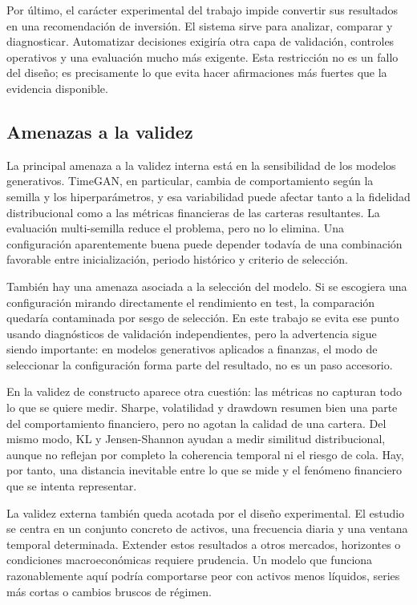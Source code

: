 \documentclass[11pt,a4paper,spanish,oneside]{book}
\numberwithin{equation}{chapter}
\numberwithin{figure}{chapter}
\begin{document}
Por último, el carácter experimental del trabajo impide convertir sus resultados en una recomendación de inversión. El sistema sirve para analizar, comparar y diagnosticar. Automatizar decisiones exigiría otra capa de validación, controles operativos y una evaluación mucho más exigente. Esta restricción no es un fallo del diseño; es precisamente lo que evita hacer afirmaciones más fuertes que la evidencia disponible.

\subsection{Amenazas a la validez}

La principal amenaza a la validez interna está en la sensibilidad de los modelos generativos. TimeGAN, en particular, cambia de comportamiento según la semilla y los hiperparámetros, y esa variabilidad puede afectar tanto a la fidelidad distribucional como a las métricas financieras de las carteras resultantes. La evaluación multi-semilla reduce el problema, pero no lo elimina. Una configuración aparentemente buena puede depender todavía de una combinación favorable entre inicialización, periodo histórico y criterio de selección.

También hay una amenaza asociada a la selección del modelo. Si se escogiera una configuración mirando directamente el rendimiento en test, la comparación quedaría contaminada por sesgo de selección. En este trabajo se evita ese punto usando diagnósticos de validación independientes, pero la advertencia sigue siendo importante: en modelos generativos aplicados a finanzas, el modo de seleccionar la configuración forma parte del resultado, no es un paso accesorio.

En la validez de constructo aparece otra cuestión: las métricas no capturan todo lo que se quiere medir. Sharpe, volatilidad y drawdown resumen bien una parte del comportamiento financiero, pero no agotan la calidad de una cartera. Del mismo modo, KL y Jensen-Shannon ayudan a medir similitud distribucional, aunque no reflejan por completo la coherencia temporal ni el riesgo de cola. Hay, por tanto, una distancia inevitable entre lo que se mide y el fenómeno financiero que se intenta representar.

La validez externa también queda acotada por el diseño experimental. El estudio se centra en un conjunto concreto de activos, una frecuencia diaria y una ventana temporal determinada. Extender estos resultados a otros mercados, horizontes o condiciones macroeconómicas requiere prudencia. Un modelo que funciona razonablemente aquí podría comportarse peor con activos menos líquidos, series más cortas o cambios bruscos de régimen.
\end{document}
